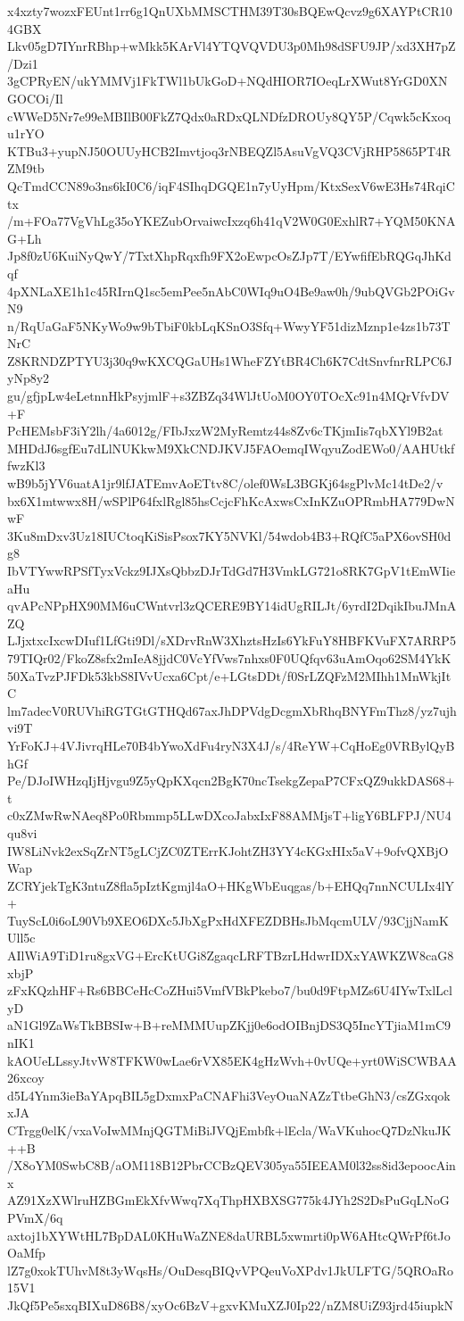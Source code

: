 x4xzty7wozxFEUnt1rr6g1QnUXbMMSCTHM39T30sBQEwQcvz9g6XAYPtCR104GBX
Lkv05gD7IYnrRBhp+wMkk5KArVl4YTQVQVDU3p0Mh98dSFU9JP/xd3XH7pZ/Dzi1
3gCPRyEN/ukYMMVj1FkTWl1bUkGoD+NQdHIOR7IOeqLrXWut8YrGD0XNGOCOi/Il
cWWeD5Nr7e99eMBIlB00FkZ7Qdx0aRDxQLNDfzDROUy8QY5P/Cqwk5cKxoqu1rYO
KTBu3+yupNJ50OUUyHCB2Imvtjoq3rNBEQZl5AsuVgVQ3CVjRHP5865PT4RZM9tb
QcTmdCCN89o3ns6kI0C6/iqF4SIhqDGQE1n7yUyHpm/KtxSexV6wE3Hs74RqiCtx
/m+FOa77VgVhLg35oYKEZubOrvaiwcIxzq6h41qV2W0G0ExhlR7+YQM50KNAG+Lh
Jp8f0zU6KuiNyQwY/7TxtXhpRqxfh9FX2oEwpcOsZJp7T/EYwfifEbRQGqJhKdqf
4pXNLaXE1h1c45RIrnQ1sc5emPee5nAbC0WIq9uO4Be9aw0h/9ubQVGb2POiGvN9
n/RqUaGaF5NKyWo9w9bTbiF0kbLqKSnO3Sfq+WwyYF51dizMznp1e4zs1b73TNrC
Z8KRNDZPTYU3j30q9wKXCQGaUHs1WheFZYtBR4Ch6K7CdtSnvfnrRLPC6JyNp8y2
gu/gfjpLw4eLetnnHkPsyjmlF+s3ZBZq34WlJtUoM0OY0TOcXc91n4MQrVfvDV+F
PcHEMsbF3iY2lh/4a6012g/FIbJxzW2MyRemtz44s8Zv6cTKjmIis7qbXYl9B2at
MHDdJ6sgfEu7dLlNUKkwM9XkCNDJKVJ5FAOemqIWqyuZodEWo0/AAHUtkffwzKl3
wB9b5jYV6uatA1jr9lfJATEmvAoETtv8C/olef0WsL3BGKj64sgPlvMc14tDe2/v
bx6X1mtwwx8H/wSPlP64fxlRgl85hsCcjcFhKcAxwsCxInKZuOPRmbHA779DwNwF
3Ku8mDxv3Uz18IUCtoqKiSisPsox7KY5NVKl/54wdob4B3+RQfC5aPX6ovSH0dg8
IbVTYwwRPSfTyxVckz9IJXsQbbzDJrTdGd7H3VmkLG721o8RK7GpV1tEmWIieaHu
qvAPcNPpHX90MM6uCWntvrl3zQCERE9BY14idUgRILJt/6yrdI2DqikIbuJMnAZQ
LJjxtxcIxcwDIuf1LfGti9Dl/sXDrvRnW3XhztsHzIs6YkFuY8HBFKVuFX7ARRP5
79TIQr02/FkoZ8sfx2mIeA8jjdC0VcYfVws7nhxs0F0UQfqv63uAmOqo62SM4YkK
50XaTvzPJFDk53kbS8IVvUcxa6Cpt/e+LGtsDDt/f0SrLZQFzM2MIhh1MnWkjItC
lm7adecV0RUVhiRGTGtGTHQd67axJhDPVdgDcgmXbRhqBNYFmThz8/yz7ujhvi9T
YrFoKJ+4VJivrqHLe70B4bYwoXdFu4ryN3X4J/s/4ReYW+CqHoEg0VRBylQyBhGf
Pe/DJoIWHzqIjHjvgu9Z5yQpKXqcn2BgK70ncTsekgZepaP7CFxQZ9ukkDAS68+t
c0xZMwRwNAeq8Po0Rbmmp5LLwDXcoJabxIxF88AMMjsT+ligY6BLFPJ/NU4qu8vi
IW8LiNvk2exSqZrNT5gLCjZC0ZTErrKJohtZH3YY4cKGxHIx5aV+9ofvQXBjOWap
ZCRYjekTgK3ntuZ8fla5pIztKgmjl4aO+HKgWbEuqgas/b+EHQq7nnNCULIx4lY+
TuyScL0i6oL90Vb9XEO6DXc5JbXgPxHdXFEZDBHsJbMqcmULV/93CjjNamKUll5c
AIlWiA9TiD1ru8gxVG+ErcKtUGi8ZgaqcLRFTBzrLHdwrIDXxYAWKZW8caG8xbjP
zFxKQzhHF+Rs6BBCeHcCoZHui5VmfVBkPkebo7/bu0d9FtpMZs6U4IYwTxlLclyD
aN1Gl9ZaWsTkBBSIw+B+reMMMUupZKjj0e6odOIBnjDS3Q5IncYTjiaM1mC9nIK1
kAOUeLLssyJtvW8TFKW0wLae6rVX85EK4gHzWvh+0vUQe+yrt0WiSCWBAA26xcoy
d5L4Ynm3ieBaYApqBIL5gDxmxPaCNAFhi3VeyOuaNAZzTtbeGhN3/csZGxqokxJA
CTrgg0elK/vxaVoIwMMnjQGTMiBiJVQjEmbfk+lEcla/WaVKuhocQ7DzNkuJK++B
/X8oYM0SwbC8B/aOM118B12PbrCCBzQEV305ya55IEEAM0l32ss8id3epoocAinx
AZ91XzXWlruHZBGmEkXfvWwq7XqThpHXBXSG775k4JYh2S2DsPuGqLNoGPVmX/6q
axtoj1bXYWtHL7BpDAL0KHuWaZNE8daURBL5xwmrti0pW6AHtcQWrPf6tJoOaMfp
lZ7g0xokTUhvM8t3yWqsHs/OuDesqBIQvVPQeuVoXPdv1JkULFTG/5QROaRo15V1
JkQf5Pe5sxqBIXuD86B8/xyOc6BzV+gxvKMuXZJ0Ip22/nZM8UiZ93jrd45iupkN
